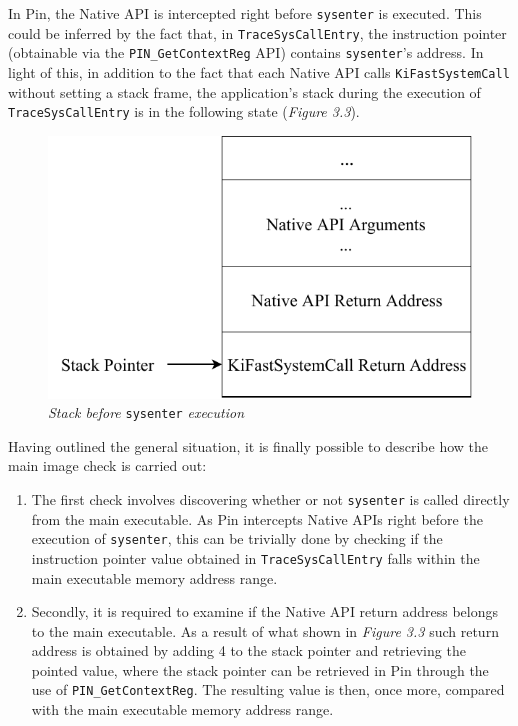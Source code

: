 \documentclass[binding=0.6cm,LaM,english,noexaminfo,oneside]{sapthesis} %
\begin{document}
In Pin, the Native API is intercepted right before \texttt{sysenter} is executed. This could be inferred by the fact that, in \texttt{TraceSysCallEntry}, the instruction pointer (obtainable via the \texttt{PIN\_GetContextReg} API) contains \texttt{sysenter}'s address. In light of this, in addition to the fact that each Native API calls \texttt{KiFastSystemCall} without setting a stack frame, the application's stack during the execution of \texttt{TraceSysCallEntry} is in the following state (\textit{Figure 3.3}).
\\
\begin{figure}[h]
\centering
\includegraphics[scale=1]{Figures/StackMainImage.pdf}
\caption{\textit{Stack before} \texttt{sysenter} \textit{execution}}
\end{figure}     

Having outlined the general situation, it is finally possible to describe how the main image check is carried out:

\begin{enumerate}
\item The first check involves discovering whether or not \texttt{sysenter} is called directly from the main executable. As Pin intercepts Native APIs right before the execution of \texttt{sysenter}, this can be trivially done by checking if the instruction pointer value obtained in \texttt{TraceSysCallEntry} falls within the main executable memory address range.
\item Secondly, it is required to examine if the Native API return address belongs to the main executable. As a result of what shown in \textit{Figure 3.3} such return address is obtained by adding 4 to the stack pointer and retrieving the pointed value, where the stack pointer can be retrieved in Pin through the use of \texttt{PIN\_GetContextReg}. The resulting value is then, once more, compared with the main executable memory address range.
\end{enumerate}
\end{document}
